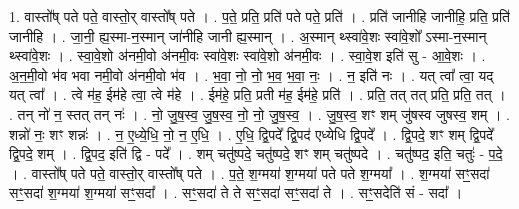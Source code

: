 \documentclass[17pt]{extarticle}
\begin{document}
1. वास्तो᳚ष् पते पते॒ वास्तो॒र् वास्तो᳚ष् पते । . प॒ते॒ प्रति॒ प्रति॑ पते पते॒ प्रति॑ । . प्रति॑ जानीहि जानीहि॒ प्रति॒ प्रति॑ जानीहि । . जा॒नी॒ ह्य॒स्मा-न॒स्मान् जा॑नीहि जानी ह्य॒स्मान् । . अ॒स्मान् थ्स्वा॑वे॒शः स्वा॑वे॒शो᳚ ऽस्मा-न॒स्मान् थ्स्वा॑वे॒शः । . स्वा॒वे॒शो अ॑नमी॒वो अ॑नमी॒वः स्वा॑वे॒शः स्वा॑वे॒शो अ॑नमी॒वः । . स्वा॒वे॒श इति॑ सु - आ॒वे॒शः । . अ॒न॒मी॒वो भ॑व भवा नमी॒वो अ॑नमी॒वो भ॑व । . भ॒वा॒ नो॒ नो॒ भ॒व॒ भ॒वा॒ नः॒ । . न॒ इति॑ नः । . यत् त्वा᳚ त्वा॒ यद् यत् त्वा᳚ । . त्वे म॑ह॒ ईम॑हे त्वा॒ त्वे म॑हे । . ईम॑हे॒ प्रति॒ प्रती म॑ह॒ ईम॑हे॒ प्रति॑ । . प्रति॒ तत् तत् प्रति॒ प्रति॒ तत् । . तन् नो॑ न॒ स्तत् तन् नः॑ । . नो॒ जु॒ष॒स्व॒ जु॒ष॒स्व॒ नो॒ नो॒ जु॒ष॒स्व॒ । . जु॒ष॒स्व॒ शꣳ शम् जु॑षस्व जुषस्व॒ शम् । . शन्नो॑ नः॒ शꣳ शन्नः॑ । . न॒ ए॒ध्ये॒धि॒ नो॒ न॒ ए॒धि॒ । . ए॒धि॒ द्वि॒पदे᳚ द्वि॒पद॑ एध्येधि द्वि॒पदे᳚ । . द्वि॒पदे॒ शꣳ शम् द्वि॒पदे᳚ द्वि॒पदे॒ शम् । . द्वि॒पद॒ इति॑ द्वि - पदे᳚ । . शम् चतु॑ष्पदे॒ चतु॑ष्पदे॒ शꣳ शम् चतु॑ष्पदे । . चतु॑ष्पद॒ इति॒ चतुः॑ - प॒दे॒ । . वास्तो᳚ष् पते पते॒ वास्तो॒र् वास्तो᳚ष् पते । . प॒ते॒ श॒ग्मया॑ श॒ग्मया॑ पते पते श॒ग्मया᳚ । . श॒ग्मया॑ सꣳ॒॒सदा॑ सꣳ॒॒सदा॑ श॒ग्मया॑ श॒ग्मया॑ सꣳ॒॒सदा᳚ । . सꣳ॒॒सदा॑ ते ते सꣳ॒॒सदा॑ सꣳ॒॒सदा॑ ते । . सꣳ॒॒सदेति॑ सं - सदा᳚ । \newline
\end{document}

